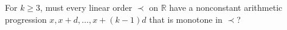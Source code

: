 For $k\ge3$, must every linear order $\prec$ on $\mathbb R$ have a nonconstant arithmetic progression $x,x+d,\ldots,x+(k-1)d$ that is monotone in $\prec$?
